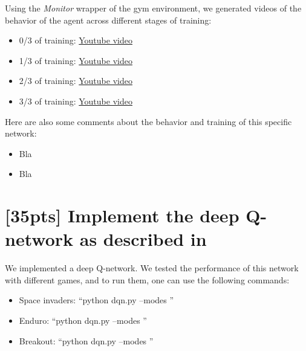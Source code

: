 \documentclass{article}
\begin{document}

Using the \textit{Monitor} wrapper of the gym environment, we generated videos of the behavior of the agent across different stages of training:

\begin{itemize}
  \item 0/3 of training: \href{http://www.sharelatex.com}{Youtube video}
  \item 1/3 of training: \href{http://www.sharelatex.com}{Youtube video}
  \item 2/3 of training: \href{http://www.sharelatex.com}{Youtube video}
  \item 3/3 of training: \href{http://www.sharelatex.com}{Youtube video}
\end{itemize}

Here are also some comments about the behavior and training of this specific network:

\begin{itemize}
  \item Bla
  \item Bla
\end{itemize}

\section{[35pts] Implement the deep Q-network as described in \cite{mnih2013playing,mnih2015human}}

We implemented a deep Q-network. We tested the performance of this network with different games, and to run them, one can use the following commands:
\begin{itemize}
  \item Space invaders: ``python dqn.py --modes ''
  \item Enduro: ``python dqn.py --modes ''
  \item Breakout: ``python dqn.py --modes ''
\end{itemize}
\end{document}
